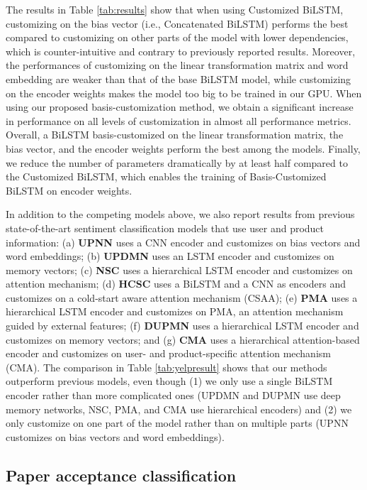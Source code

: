 \documentclass[11pt,a4paper]{article}
\begin{document}
The results in Table \ref{tab:results} show that when using Customized BiLSTM, customizing on the bias vector (i.e., Concatenated BiLSTM) performs the best compared to customizing on other parts of the model with lower dependencies, which is counter-intuitive and contrary to previously reported results. Moreover, the performances of customizing on the linear transformation matrix and word embedding are weaker than that of the base BiLSTM model, while customizing on the encoder weights makes the model too big to be trained in our GPU. When using our proposed basis-customization method, we obtain a significant increase in performance on all levels of customization in almost all performance metrics. Overall, a BiLSTM basis-customized on the linear transformation matrix, the bias vector, and the encoder weights perform the best among the models. Finally, we reduce the number of parameters dramatically by at least half compared to the Customized BiLSTM, which enables the training of Basis-Customized BiLSTM on encoder weights.

In addition to the competing models above, we also report results from previous state-of-the-art sentiment classification models that use user and product information:
(a) \textbf{UPNN} \cite{tang2015learning} uses a CNN encoder and customizes on bias vectors and word embeddings;
(b) \textbf{UPDMN} \cite{dou2017capturing} uses an LSTM encoder and customizes on memory vectors;
(c) \textbf{NSC} \cite{chen2016neural} uses a hierarchical LSTM encoder and customizes on attention mechanism;
(d) \textbf{HCSC} \cite{amplayo2018cold} uses a BiLSTM and a CNN as encoders and customizes on a cold-start aware attention mechanism (CSAA);
(e) \textbf{PMA} \cite{pengcheng2017parallel} uses a hierarchical LSTM encoder and customizes on PMA, an attention mechanism guided by external features;
(f) \textbf{DUPMN} \cite{long2018dual} uses a hierarchical LSTM encoder and customizes on memory vectors; and
(g) \textbf{CMA} \cite{ma2017cascading} uses a hierarchical attention-based encoder and customizes on user- and product-specific attention mechanism (CMA).
The comparison in Table \ref{tab:yelpresult} shows that our methods outperform previous models, even though (1) we only use a single BiLSTM encoder rather than more complicated ones (UPDMN and DUPMN use deep memory networks, NSC, PMA, and CMA use hierarchical encoders) and (2) we only customize on one part of the model rather than on multiple parts (UPNN customizes on bias vectors and word embeddings).

\subsection{Paper acceptance classification}
\end{document}
